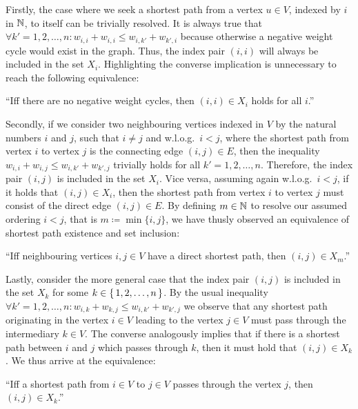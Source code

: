 Firstly, the case where we seek a shortest path from a vertex $u \in V$, indexed by $i$ in $\mathbb{N}$, to itself can be trivially resolved.
It is always true that $\forall k' = 1, 2, \dots, n: w_{i, i} + w_{i, i} \leq w_{i, k'} + w_{k', i}$ because otherwise a negative weight cycle would exist in the graph.
Thus, the index pair $(i, i)$ will always be included in the set $X_i$.
Highlighting the converse implication is unnecessary to reach the following equivalence:
\begin{displayquote}
    ``Iff there are no negative weight cycles, then $(i, i) \in X_i$ holds for all $i$.''
\end{displayquote}

Secondly, if we consider two neighbouring vertices indexed in $V$ by the natural numbers $i$ and $j$, such that $i \neq j$ and w.l.o.g.\ $i < j$, where the shortest path from vertex $i$ to vertex $j$ is the connecting edge $(i, j) \in E$, then the inequality $w_{i, i} + w_{i, j} \leq w_{i, k'} + w_{k', j}$ trivially holds for all $k' = 1, 2, \dots, n$.
Therefore, the index pair $(i, j)$ is included in the set $X_i$.
Vice versa, assuming again w.l.o.g.\ $i < j$, if it holds that $(i, j) \in X_i$, then the shortest path from vertex $i$ to vertex $j$ must consist of the direct edge $(i, j) \in E$.
By defining $m \in \mathbb{N}$ to resolve our assumed ordering $i < j$, that is $m \coloneqq \min \{ i, j \}$, we have thusly observed an equivalence of shortest path existence and set inclusion:
\begin{displayquote}
    ``Iff neighbouring vertices $i, j \in V$ have a direct shortest path, then $(i, j) \in X_m$.''
\end{displayquote}

Lastly, consider the more general case that the index pair $(i, j)$ is included in the set $X_k$ for some $k \in \left\{\,1, 2, \dots, n\,\right\}$.
By the usual inequality $\forall k' = 1, 2, \dots, n: w_{i, k} + w_{k, j} \leq w_{i, k'} + w_{k', j}$ we observe that any shortest path originating in the vertex $i \in V$ leading to the vertex $j \in V$ must pass through the intermediary $k \in V$.
The converse analogously implies that if there is a shortest path between $i$ and $j$ which passes through $k$, then it must hold that $(i, j) \in X_k$.
We thus arrive at the equivalence:
\begin{displayquote}
    ``Iff a shortest path from $i \in V$ to $j \in V$ passes through the vertex $j$, then $(i, j) \in X_k$.''
\end{displayquote}

